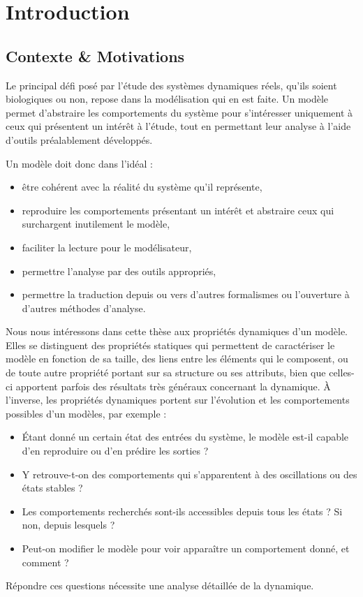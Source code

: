
\chapter{Introduction}

\section{Contexte \& Motivations}

Le principal défi posé par l'étude des systèmes dynamiques réels,
qu'ils soient biologiques ou non,
repose dans la modélisation qui en est faite.
Un modèle permet d'abstraire les comportements du système
pour s'intéresser uniquement à ceux qui présentent un intérêt à l'étude,
tout en permettant leur analyse à l'aide d'outils préalablement développés.

Un modèle doit donc dans l'idéal :
\begin{itemize}
  \item être cohérent avec la réalité du système qu'il représente,
  \item reproduire les comportements présentant un intérêt
    et abstraire ceux qui surchargent inutilement le modèle,
  \item faciliter la lecture pour le modélisateur,
  \item permettre l'analyse par des outils appropriés,
  \item permettre la traduction depuis ou vers d'autres formalismes
    ou l'ouverture à d'autres méthodes d'analyse.
\end{itemize}

Nous nous intéressons dans cette thèse aux propriétés dynamiques d'un modèle.
Elles se distinguent des propriétés statiques qui permettent de caractériser le modèle
en fonction de sa taille,
des liens entre les éléments qui le composent,
ou de toute autre propriété portant sur sa structure ou ses attributs,
bien que celles-ci apportent parfois des résultats très généraux concernant la dynamique.
À l'inverse, les propriétés dynamiques portent sur l'évolution et les comportements
possibles d'un modèles, par exemple :
\begin{itemize}
  \item Étant donné un certain état des entrées du système, le modèle est-il capable
    d'en reproduire ou d'en prédire les sorties ?
  \item Y retrouve-t-on des comportements qui s'apparentent à des oscillations
    ou des états stables ?
  \item Les comportements recherchés sont-ils accessibles depuis tous les états ?
    Si non, depuis lesquels ?
  \item Peut-on modifier le modèle pour voir apparaître un comportement donné, et comment ?
\end{itemize}
Répondre ces questions nécessite une analyse détaillée de la dynamique.

